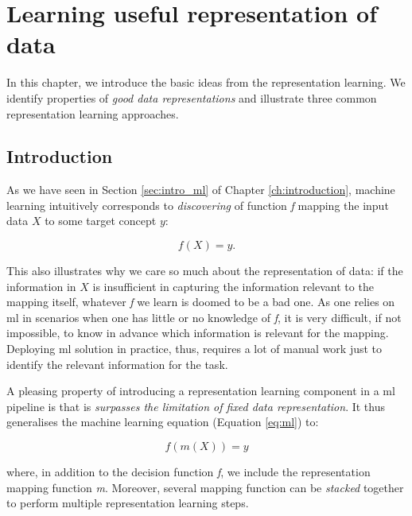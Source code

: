 \chapter{Learning useful representation of data}\label{ch:learningrepresentations}



In this chapter, we introduce the basic ideas from the representation learning.
We identify properties of \textit{good data representations} and illustrate three common representation learning approaches.




\section{Introduction}


As we have seen in Section \ref{sec:intro_ml} of Chapter \ref{ch:introduction}, machine learning intuitively corresponds to \textit{discovering} of function \textit{f} mapping the input data $X$ to some target concept $y$:

\begin{equation}
	f(X) = y.
	\label{eq:ml}
\end{equation}


This also illustrates why we care so much about the representation of data: if the information in $X$ is insufficient in capturing the information relevant to the mapping itself, whatever \textit{f} we learn  is doomed to be a bad one.
As one relies on \gls{ml} in scenarios when one has little or no knowledge of \textit{f}, it is very difficult, if not impossible, to know in advance which information is relevant for the mapping.
Deploying \gls{ml} solution in practice, thus, requires a lot of manual work just to identify the relevant information for the task.



A pleasing property of introducing a representation learning component in a \gls{ml} pipeline is that is \textit{surpasses the limitation of fixed data representation}.
It thus generalises the machine learning equation (Equation \ref{eq:ml}) to:

\begin{equation}
	f(m(X)) = y
\end{equation}

where, in addition to the decision function \textit{f}, we include the representation mapping function \textit{m}.
Moreover, several mapping function can be \textit{stacked} together to perform multiple representation learning steps.







